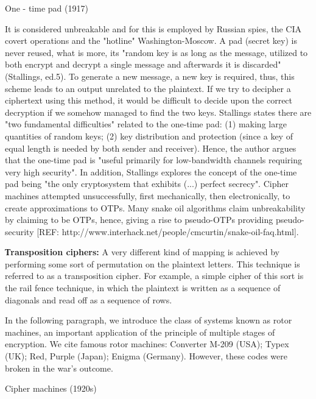  One - time pad (1917)

It is considered unbreakable and for this is employed by Russian spies, the CIA covert operations and the "hotline" Washington-Moscow. A pad (secret key) is never reused, what is more,  its "random key is as long as the message, utilized to both encrypt and decrypt a single message and afterwards it is discarded"(Stallings, ed.5). To generate a new message, a new key is required, thus, this scheme leads to an output unrelated to the plaintext. If we try to decipher a ciphertext using this method, it would be difficult to decide upon the correct decryption if we somehow managed to find the two keys. Stallings states there are "two fundamental difficulties" related to the one-time pad: (1) making large quantities of random keys; (2) key distribution and protection (since a key of equal length is needed by both sender and receiver). Hence, the author argues that the one-time pad is "useful primarily for low-bandwidth channels requiring very high security". In addition, Stallings explores the concept of the one-time pad being "the only cryptosystem that exhibits (...) perfect secrecy".
Cipher machines attempted unsuccessfully, first mechanically, then electronically, to create approximations to OTPs. Many snake oil algorithms claim unbreakability by claiming to be OTPs, hence, giving a rise to pseudo-OTPs providing pseudo-security [REF: http://www.interhack.net/people/cmcurtin/snake-oil-faq.html].


\textbf{Тransposition ciphers:} A very different kind of mapping is achieved by performing some sort of permutation on the plaintext letters. This technique is referred to as a transposition cipher. For example, a simple cipher of this sort is the rail fence technique, in which the plaintext is written as a sequence of diagonals and read off as a sequence of rows.

In the following paragraph, we introduce the class of systems known as rotor machines, an important application of the principle of multiple stages of encryption. We cite famous rotor machines: Converter M-209 (USA); Typex (UK); Red, Purple (Japan); Enigma (Germany). However, these codes were broken in the war’s outcome. 

Cipher machines (1920s)

